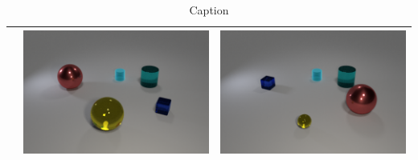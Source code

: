 \begin{table}
\begin{tabular}{@{}ccc@{}}
\begin{minipage}{.3\textwidth}
    \end{minipage}
    &
    \begin{minipage}{.3\textwidth}
      \includegraphics[width=\linewidth]{figures/clevr_datasets/sclevr_size2.png}
    \end{minipage}
    &
    \begin{minipage}{.3\textwidth}
      \includegraphics[width=\linewidth]{figures/clevr_datasets/sclevr_rel2.png}
    \end{minipage}
\\

\bottomrule
\end{tabular}
\caption{Caption}
\end{table}